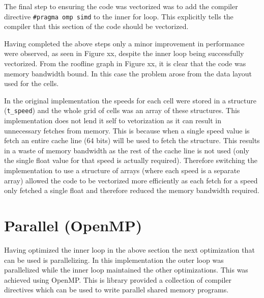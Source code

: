 \documentclass{article}
\begin{document}
\begin{multicols}{2}
The final step to ensuring the code was vectorized was to add the compiler
directive \verb|#pragma omp simd| to the inner for loop. This explicitly tells
the compiler that this section of the code should be vectorized. 

Having completed the above steps only a minor improvement in performance were
observed, as seen in Figure xx, despite the inner loop being successfully
vectorized. From the roofline graph in Figure xx, it is clear that the code was
memory bandwidth bound. In this case the problem arose from the data layout used for the cells.

In the original implementation the speeds for each cell were stored in a
structure (\verb|t_speed|) and the whole grid of cells was an array of these
structures. This implementation does not lend it self to vetorization as it
can result in unnecessary fetches from memory. This is because when a single
speed value is fetch an entire cache line (64 bits) will be used to fetch the
structure. This results in a waste of memory bandwidth as the rest of the
cache line is not used (only the single float value for that speed is actually
required). Therefore switching the implementation to use a structure of arrays
(where each speed is a separate array) allowed the code to be vectorized more
efficiently as each fetch for a speed only fetched a single float and therefore
reduced the memory bandwidth required. 


\section{Parallel (OpenMP)}

Having optimized the inner loop in the above section the next optimization that
can be used is parallelizing. In this implementation the outer loop was
parallelized while the inner loop maintained the other optimizations. This was
achieved using OpenMP. This is library provided a collection of compiler
directives which can be used to write parallel shared memory programs.


\end{multicols}
\end{document}
